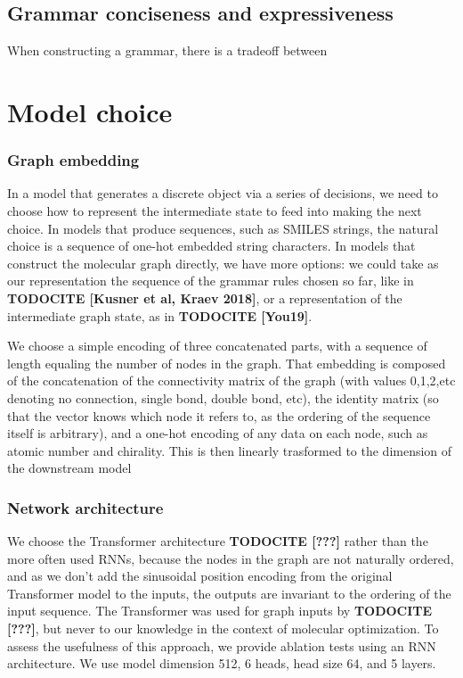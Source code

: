 \documentclass{article}
\newcommand{\CITE}[1]{{\bf TODOCITE [#1]}}
\begin{document}
\subsection{Grammar conciseness and expressiveness}\label{sec:expressiveness}
When constructing a grammar, there is a tradeoff between 


\section{Model choice}\label{sec:model}
\subsubsection{Graph embedding}
In a model that generates a discrete object via a series of decisions, we need to choose how to represent the intermediate state to feed into making the next choice. In models that produce sequences, such as SMILES strings, the natural choice is a sequence of one-hot embedded string characters. In models that construct the molecular graph directly, we have more options: we could take as our representation the sequence of the grammar rules chosen so far, like in \CITE{Kusner et al, Kraev 2018}, or a representation of the intermediate graph state, as in \CITE{You19}.

We choose a simple encoding of three concatenated parts, with a sequence of length equaling the number of nodes in the graph. That embedding is composed of the concatenation of the connectivity matrix of the graph (with values 0,1,2,etc denoting no connection, single bond, double bond, etc), the identity matrix (so that the vector knows which node it refers to, as the ordering of the sequence itself is arbitrary), and a one-hot encoding of any data on each node, such as atomic number and chirality. This is then linearly trasformed to the dimension of the downstream model
\subsubsection{Network architecture}
We choose the Transformer architecture \CITE{???} rather than the more often used RNNs, because the nodes in the graph are not naturally ordered, and as we don't add the sinusoidal position encoding from the original Transformer model to the inputs, the outputs are invariant to the ordering of the input sequence. The Transformer was used for graph inputs by \CITE{???}, but never to our knowledge in the context of molecular optimization. To assess the usefulness of this approach, we provide ablation tests using an RNN architecture. We use model dimension 512, 6 heads, head size 64, and 5 layers. 
\end{document}
